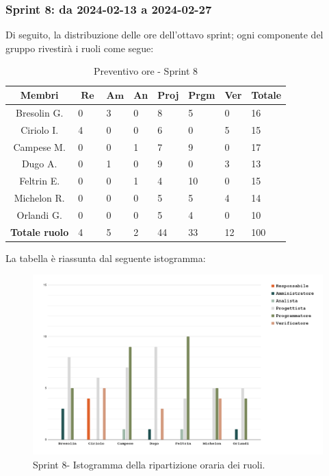 \documentclass[10pt, a4paper]{article}
\begin{document}
\subsubsection{Sprint 8: da 2024-02-13 a 2024-02-27}
Di seguito, la distribuzione delle ore dell'ottavo sprint; ogni componente del gruppo rivestirà i ruoli come segue:
\begin{table}[H]
\begin{tabularx}{\textwidth}{c|X|X|X|X|X|X|X}
    \textbf{Membri} & $\operatorname{\textbf{Re}}$ & $\mathrm{\textbf{Am}}$ & \textbf{An} & \textbf{Proj} & \textbf{Prgm} & \textbf{Ver} & \textbf{Totale} \\
        \hline Bresolin G. & 0 & \cellcolor{primarycolor}3 & 0 & 8 & 5 & 0 & 16 \\
        \hline Ciriolo I.  & \cellcolor{primarycolor}4 & 0 & 0 & 6 & 0 & 5 & 15 \\
        \hline Campese M.  & 0 & 0 & 1 & 7 & \cellcolor{primarycolor}9 & 0 & 17 \\
        \hline Dugo A.     & 0 & 1 & 0 & \cellcolor{primarycolor}9 & 0 & 3 & 13 \\
        \hline Feltrin E.  & 0 & 0 & 1 & 4 & \cellcolor{primarycolor}10 & 0 & 15 \\
        \hline Michelon R. & 0 & 0 & 0 & 5 & 5 & \cellcolor{primarycolor}4 & 14 \\
        \hline Orlandi G.  & 0 & 0 & 0 & \cellcolor{primarycolor}5 & 4 & 0 & 10 \\
        \hline
        \textbf{Totale ruolo} & 4 & 5 & 2 & 44 & 33 & 12 & 100 
    \end{tabularx}
    \caption{Preventivo ore - Sprint 8}
    \end{table}

La tabella è riassunta dal seguente istogramma:
 \begin{figure}[H]
        \centering        
        \includegraphics[width=15.5cm]{istogrammi/istogramma_8_periodo.png}
        \caption{Sprint 8- Istogramma della ripartizione oraria dei ruoli. }
    \end{figure}
\end{document}
